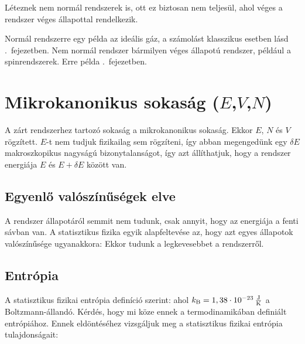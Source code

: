   Léteznek nem normál rendszerek is, ott ez biztosan nem teljesül, ahol véges a rendszer véges állapottal rendelkezik. 
  
  Normál rendszerre egy példa az ideális gáz, a számolást klasszikus esetben lásd .\ fejezetben. Nem normál rendszer bármilyen véges állapotú rendszer, például a spinrendszerek. Erre példa .\ fejezetben. 
  
 \section{Mikrokanonikus sokaság ($E$,$V$,$N$)}\label{ss:B03-mikrokansok}
  
  A zárt rendszerhez tartozó sokaság a mikrokanonikus sokaság. Ekkor $E$, $N$ és $V$ rögzített. $E$-t nem tudjuk fizikailag sem rögzíteni, így abban megengedünk egy $\delta E$ makroszkopikus nagyságú bizonytalanságot, így azt állíthatjuk, hogy a rendszer energiája $E$ és $E+\delta E$ között van. 
  
  \subsection{Egyenlő valószínűségek elve}
   
   A rendszer állapotáról semmit nem tudunk, csak annyit, hogy az energiája a fenti sávban van. A statisztikus fizika egyik alapfeltevése az, hogy azt egyes állapotok valószínűsége ugyanakkora:
   Ekkor tudunk a legkevesebbet a rendszerről.
   
  \subsection{Entrópia}
   
   A statisztikus fizikai entrópia definíció szerint:
   ahol $k_\text{B}=1,38\cdot 10^{-23}\mathrm{\, \frac{J}{K}}$ a Boltzmann-állandó. Kérdés, hogy mi köze ennek a termodinamikában definiált entrópiához. Ennek eldöntéséhez vizsgáljuk meg a statisztikus fizikai entrópia tulajdonságait:
   
